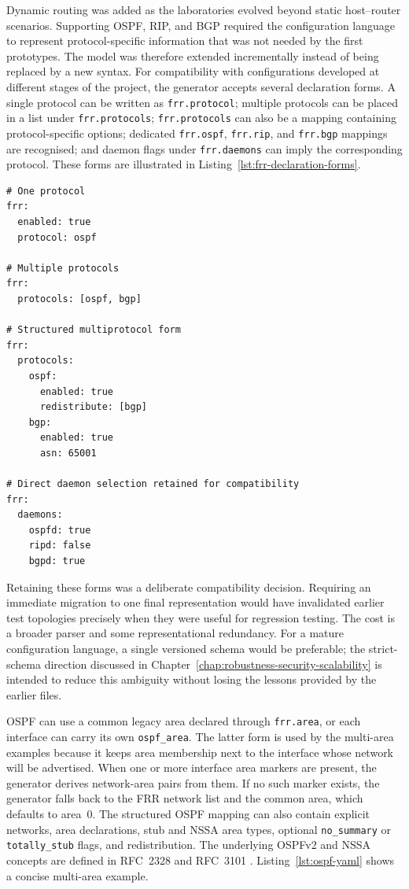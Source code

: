 Dynamic routing was added as the laboratories evolved beyond static
host--router scenarios. Supporting OSPF, RIP, and BGP required the
configuration language to represent protocol-specific information that was not
needed by the first prototypes. The model was therefore extended incrementally
instead of being replaced by a new syntax. For compatibility with
configurations developed at different stages of the project, the generator
accepts several declaration forms. A single protocol can be written as
\texttt{frr.protocol}; multiple protocols can be placed in a list under
\texttt{frr.protocols}; \texttt{frr.protocols} can also be a mapping containing
protocol-specific options; dedicated \texttt{frr.ospf}, \texttt{frr.rip}, and
\texttt{frr.bgp} mappings are recognised; and daemon flags under
\texttt{frr.daemons} can imply the corresponding protocol. These forms are
illustrated in Listing~\ref{lst:frr-declaration-forms}.

\begin{lstlisting}[caption={Compatible FRRouting protocol declaration forms.},label={lst:frr-declaration-forms}]
# One protocol
frr:
  enabled: true
  protocol: ospf

# Multiple protocols
frr:
  protocols: [ospf, bgp]

# Structured multiprotocol form
frr:
  protocols:
    ospf:
      enabled: true
      redistribute: [bgp]
    bgp:
      enabled: true
      asn: 65001

# Direct daemon selection retained for compatibility
frr:
  daemons:
    ospfd: true
    ripd: false
    bgpd: true
\end{lstlisting}

Retaining these forms was a deliberate compatibility decision. Requiring an
immediate migration to one final representation would have invalidated earlier
test topologies precisely when they were useful for regression testing. The
cost is a broader parser and some representational redundancy. For a mature
configuration language, a single versioned schema would be preferable; the
strict-schema direction discussed in
Chapter~\ref{chap:robustness-security-scalability} is intended to reduce this
ambiguity without losing the lessons provided by the earlier files.

OSPF can use a common legacy area declared through \texttt{frr.area}, or each
interface can carry its own \texttt{ospf\_area}. The latter form is used by the
multi-area examples because it keeps area membership next to the interface
whose network will be advertised. When one or more interface area markers are
present, the generator derives network-area pairs from them. If no such marker
exists, the generator falls back to the FRR network list and the common area,
which defaults to area~0. The structured OSPF mapping can also contain
explicit networks, area declarations, stub and NSSA area types, optional
\texttt{no\_summary} or \texttt{totally\_stub} flags, and redistribution.
The underlying OSPFv2 and NSSA concepts are defined in RFC~2328 and RFC~3101
\cite{rfc2328,rfc3101}.
Listing~\ref{lst:ospf-yaml} shows a concise multi-area example.

